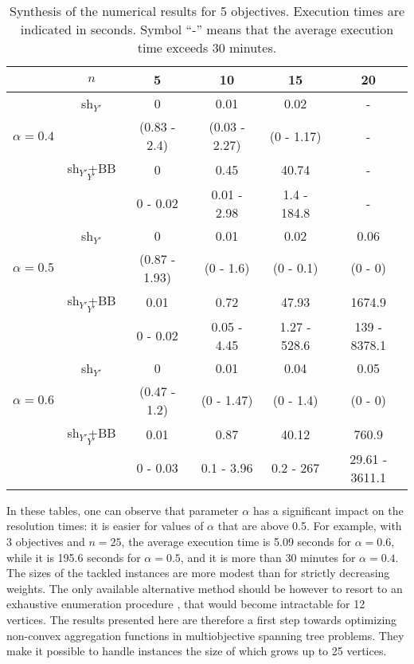\documentclass[final,3p,times]{elsarticle}
\begin{document}
\begin{table}[!h]
  \begin{center}
  {\small \begin{tabular}{|c|c|cccc|}
    \hline
      \rule[1pt]{0pt}{13pt} 
       &$n$ & 5&10&15&20\\
       \hline
     \hline
    & sh$_{Y'}$&0&0.01&0.02&-\\
       $\alpha = 0.4$   & &(0.83 - 2.4)&(0.03 - 2.27)&(0 - 1.17)& -\\
       \cline{2-6} 
       &sh$_{Y'}$+BB$_{Y'}$&0&0.45&40.74&-\\
       &  &0 - 0.02&0.01 - 2.98&1.4 - 184.8& -\\
  \hline
  \hline
   & sh$_{Y'}$&0&0.01&0.02&0.06\\
$\alpha = 0.5$  & &(0.87 - 1.93)&(0 - 1.6)&(0 - 0.1)&(0 - 0)\\

    \cline{2-6} 
 &sh$_{Y'}$+BB$_{Y'}$&0.01&0.72&47.93&1674.9\\
  &  &0 - 0.02&0.05 - 4.45&1.27 - 528.6&139 - 8378.1\\
  \hline
  \hline
  & sh$_{Y'}$&0&0.01&0.04&0.05\\
  $\alpha = 0.6$  & &(0.47 - 1.2)&(0 - 1.47)&(0 - 1.4)&(0 - 0)\\
  \cline{2-6} 
  &sh$_{Y'}$+BB$_{Y'}$&0.01&0.87&40.12&760.9\\
  &  &0 - 0.03&0.1 - 3.96&0.2 - 267& 29.61 - 3611.1\\
  \hline
    \end{tabular}
}

\end{center}
\caption{\label{tabPL6} Synthesis of the numerical results for 5 objectives. Execution times are
  indicated in seconds. Symbol ``-'' means that the average execution time exceeds 30 minutes.}
\end{table}

In these tables, one can observe that parameter $\alpha$ has a significant impact on the resolution times: it is easier for values of $\alpha$ that are above 0.5. For
example, with 3 objectives and $n = 25$, the
average execution time is 5.09 seconds for $\alpha = 0.6$, while it
is 195.6 seconds for $\alpha = 0.5$, and it is more than 30 minutes
for $\alpha = 0.4$. The sizes of the tackled instances are more modest than for strictly decreasing weights. The only available alternative method should be however to resort to an exhaustive enumeration procedure \cite{KapoR95}, that would become
intractable for 12 vertices. The results presented here are therefore
a first step towards optimizing non-convex aggregation functions in
multiobjective spanning tree problems. They make it possible to handle
instances the size of which grows up to 25 vertices. 
\end{document}
